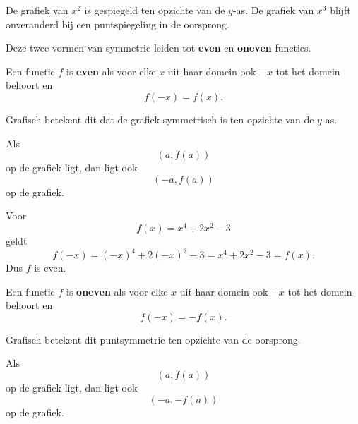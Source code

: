 \documentclass{ximera}
\begin{document}
De grafiek van \(x^2\) is gespiegeld ten opzichte van de \(y\)-as.
De grafiek van \(x^3\) blijft onveranderd bij een puntspiegeling in de oorsprong.

Deze twee vormen van symmetrie leiden tot \textbf{even} en \textbf{oneven} functies.


\begin{definitie}
Een functie \(f\) is \textbf{even} als voor elke \(x\) uit haar domein ook
\(-x\) tot het domein behoort en
\[
\boxed{f(-x)=f(x).}
\]
\end{definitie}

Grafisch betekent dit dat de grafiek symmetrisch is ten opzichte van de \(y\)-as.

Als
\[
(a,f(a))
\]
op de grafiek ligt, dan ligt ook
\[
(-a,f(a))
\]
op de grafiek.

\begin{center}
\end{center}

\begin{voorbeeld}
Voor
\[
f(x)=x^4+2x^2-3
\]
geldt
\[
f(-x)=(-x)^4+2(-x)^2-3=x^4+2x^2-3=f(x).
\]
Dus \(f\) is even.
\end{voorbeeld}


\begin{definitie}
Een functie \(f\) is \textbf{oneven} als voor elke \(x\) uit haar domein ook
\(-x\) tot het domein behoort en
\[
\boxed{f(-x)=-f(x).}
\]
\end{definitie}

Grafisch betekent dit puntsymmetrie ten opzichte van de oorsprong.

Als
\[
(a,f(a))
\]
op de grafiek ligt, dan ligt ook
\[
(-a,-f(a))
\]
op de grafiek.

\begin{center}
\end{center}
\end{document}
